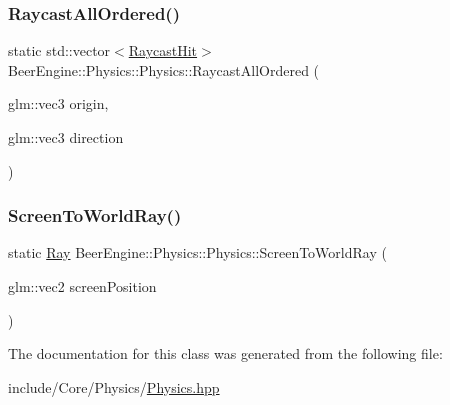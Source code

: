 \subsubsection{\texorpdfstring{Raycast\+All\+Ordered()}{RaycastAllOrdered()}}
{\footnotesize\ttfamily static std\+::vector$<$\mbox{\hyperlink{struct_beer_engine_1_1_physics_1_1_raycast_hit}{Raycast\+Hit}}$>$ Beer\+Engine\+::\+Physics\+::\+Physics\+::\+Raycast\+All\+Ordered (\begin{DoxyParamCaption}\item[{glm\+::vec3}]{origin,  }\item[{glm\+::vec3}]{direction }\end{DoxyParamCaption})\hspace{0.3cm}{\ttfamily [static]}}

\mbox{\label{class_beer_engine_1_1_physics_1_1_physics_ac345bcbfc2b0a5d7dd3b5d7fb6694825}} 
\subsubsection{\texorpdfstring{Screen\+To\+World\+Ray()}{ScreenToWorldRay()}}
{\footnotesize\ttfamily static \mbox{\hyperlink{struct_beer_engine_1_1_physics_1_1_ray}{Ray}} Beer\+Engine\+::\+Physics\+::\+Physics\+::\+Screen\+To\+World\+Ray (\begin{DoxyParamCaption}\item[{glm\+::vec2}]{screen\+Position }\end{DoxyParamCaption})\hspace{0.3cm}{\ttfamily [static]}}



The documentation for this class was generated from the following file\+:\begin{DoxyCompactItemize}
\item 
include/\+Core/\+Physics/\mbox{\hyperlink{_physics_8hpp}{Physics.\+hpp}}\end{DoxyCompactItemize}
